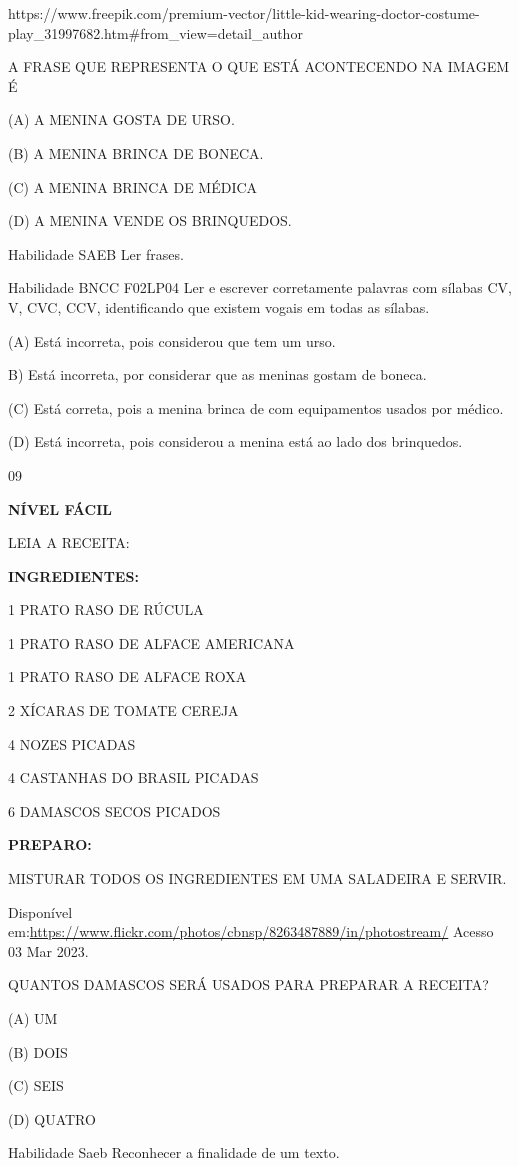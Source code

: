 {{https://www.freepik.com/premium-vector/little-kid-wearing-doctor-costume-play\_31997682.htm\#from\_view=detail\_author

A FRASE QUE REPRESENTA O QUE ESTÁ ACONTECENDO NA IMAGEM É

(A) A MENINA GOSTA DE URSO.

(B) A MENINA BRINCA DE BONECA.

(C) A MENINA BRINCA DE MÉDICA

(D) A MENINA VENDE OS BRINQUEDOS.

Habilidade SAEB Ler frases.

Habilidade BNCC F02LP04 Ler e escrever corretamente palavras com sílabas
CV, V, CVC, CCV, identificando que existem vogais em todas as sílabas.

(A) Está incorreta, pois considerou que tem um urso.

B) Está incorreta, por considerar que as meninas gostam de boneca.

(C) Está correta, pois a menina brinca de com equipamentos usados por
médico.

(D) Está incorreta, pois considerou a menina está ao lado dos
brinquedos.

\num{09}

\textbf{NÍVEL FÁCIL}

LEIA A RECEITA:

\textbf{INGREDIENTES:}

1 PRATO RASO DE RÚCULA

1 PRATO RASO DE ALFACE AMERICANA

1 PRATO RASO DE ALFACE ROXA

2 XÍCARAS DE TOMATE CEREJA

4 NOZES PICADAS

4 CASTANHAS DO BRASIL PICADAS

6 DAMASCOS SECOS PICADOS

\textbf{PREPARO:}

MISTURAR TODOS OS INGREDIENTES EM UMA SALADEIRA E SERVIR.

Disponível
em:\url{https://www.flickr.com/photos/cbnsp/8263487889/in/photostream/}
Acesso 03 Mar 2023.

QUANTOS DAMASCOS SERÁ USADOS PARA PREPARAR A RECEITA?

(A) UM

(B) DOIS

(C) SEIS

(D) QUATRO

Habilidade Saeb Reconhecer a finalidade de um texto.

}}
